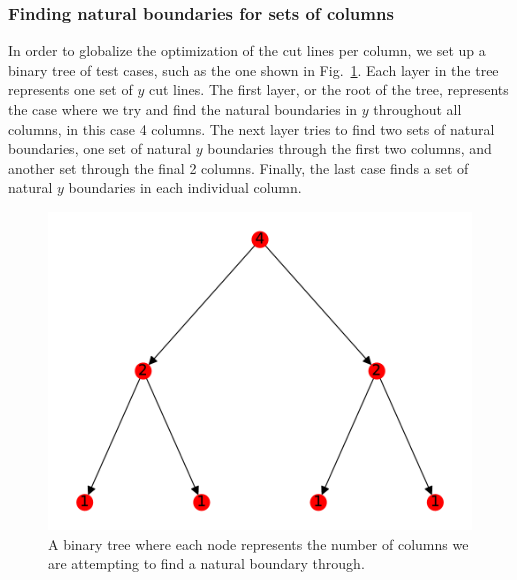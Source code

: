 \documentclass[times,final]{elsarticle}
\begin{document}
\subsubsection{Finding natural boundaries for sets of columns}
In order to globalize the optimization of the cut lines per column, we set up a binary tree of test cases, such as the one shown in Fig.~\ref{binary_tree}. Each layer in the tree represents one set of $y$ cut lines. The first layer, or the root of the tree, represents the case where we try and find the natural boundaries in $y$ throughout all columns, in this case 4 columns. The next layer tries to find two sets of natural boundaries, one set of natural $y$ boundaries through the first two columns, and another set through the final 2 columns. Finally, the last case finds a set of natural $y$ boundaries in each individual column.

\begin{figure}[h]
\centering
\includegraphics[scale=0.75]{../figures/binary_tree.pdf}
\caption{A binary tree where each node represents the number of columns we are attempting to find a natural boundary through.}
\label{binary_tree}
\end{figure}
\end{document}

